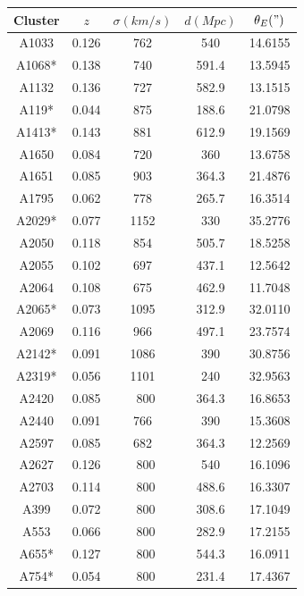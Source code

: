 \begin{table}[]
\centering

\begin{tabular}{ccccc}
Cluster & $z$   & $\sigma(km/s)$ & $d(Mpc)$ & $\theta_{E}(")$ \\ \hline \hline
A1033   & 0.126 & 762            & 540 & 14.6155  \\
A1068*  & 0.138 & 740            & 591.4 & 13.5945  \\
A1132   & 0.136 & 727            & 582.9 & 13.1515   \\
A119*   & 0.044 & 875            & 188.6 & 21.0798   \\
A1413*  & 0.143 & 881            & 612.9 & 19.1569   \\
A1650   & 0.084 & 720            & 360 & 13.6758   \\
A1651   & 0.085 & 903            & 364.3 & 21.4876   \\
A1795   & 0.062 & 778            & 265.7 & 16.3514   \\
A2029*  & 0.077 & 1152           & 330 & 35.2776   \\
A2050   & 0.118 & 854            & 505.7 & 18.5258   \\
A2055   & 0.102 & 697            & 437.1 & 12.5642   \\
A2064   & 0.108 & 675            & 462.9 & 11.7048   \\
A2065*  & 0.073 & 1095           & 312.9 & 32.0110   \\
A2069   & 0.116 & 966            & 497.1 & 23.7574   \\
A2142*  & 0.091 & 1086           & 390 & 30.8756   \\
A2319*  & 0.056 & 1101           & 240 & 32.9563   \\
A2420   & 0.085 & ~800           & 364.3 & 16.8653   \\
A2440   & 0.091 & 766            & 390 & 15.3608   \\
A2597   & 0.085 & 682            & 364.3 & 12.2569   \\
A2627   & 0.126 & ~800           & 540 & 16.1096   \\
A2703   & 0.114 & ~800           & 488.6 & 16.3307   \\
A399    & 0.072 & ~800           & 308.6 & 17.1049   \\
A553    & 0.066 & ~800           & 282.9 & 17.2155   \\
A655*   & 0.127 & ~800           & 544.3 & 16.0911   \\
A754*   & 0.054 & ~800           & 231.4 & 17.4367   \\

\end{tabular}
\end{table}
